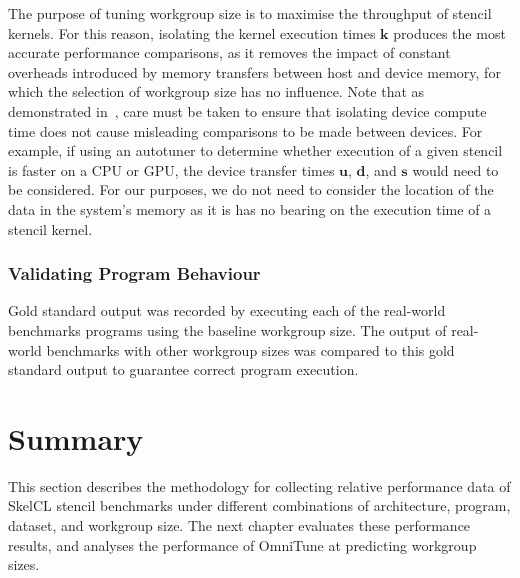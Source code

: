 %
The purpose of tuning workgroup size is to maximise the throughput of
stencil kernels. For this reason, isolating the kernel execution times
$\bm{k}$ produces the most accurate performance comparisons, as it
removes the impact of constant overheads introduced by memory
transfers between host and device memory, for which the selection of
workgroup size has no influence. Note that as demonstrated
in~\cite{Gregg2011}, care must be taken to ensure that isolating
device compute time does not cause misleading comparisons to be made
between devices. For example, if using an autotuner to determine
whether execution of a given stencil is faster on a CPU or GPU, the
device transfer times $\bm{u}$, $\bm{d}$, and $\bm{s}$ would need to
be considered. For our purposes, we do not need to consider the
location of the data in the system's memory as it is has no bearing on
the execution time of a stencil kernel.


\subsubsection{Validating Program Behaviour}

Gold standard output was recorded by executing each of the real-world
benchmarks programs using the baseline workgroup size. The output of
real-world benchmarks with other workgroup sizes was compared to this
gold standard output to guarantee correct program execution.


\section{Summary}

This section describes the methodology for collecting relative
performance data of SkelCL stencil benchmarks under different
combinations of architecture, program, dataset, and workgroup size.
The next chapter evaluates these performance results, and analyses the
performance of OmniTune at predicting workgroup sizes.
